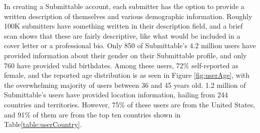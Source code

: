 \documentclass[]{report}   %
\begin{document}
\FloatBarrier
In creating a Submittable account, each submitter has the option to provide a written description of themselves and various demographic information. Roughly 100K submitters have something written in their description field, and a brief scan shows that these are fairly descriptive, like what would be included in a cover letter or a professional bio. Only 850 of Submittable's 4.2 million users have provided information about their gender on their Submittable profile, and only 760 have provided valid birthdates. Among these users, 72\% self-reported as female, and the reported age distribution is as seen in Figure \ref{fig:userAge}, with the overwhelming majority of users between 36 and 45 years old. 1.2 million of Submittable's users have provided location information, hailing from 244 countries and territories. However, 75\% of these users are from the United States, and 91\% of them are from the top ten countries shown in Table\ref{table:userCountry}. 
\end{document}
